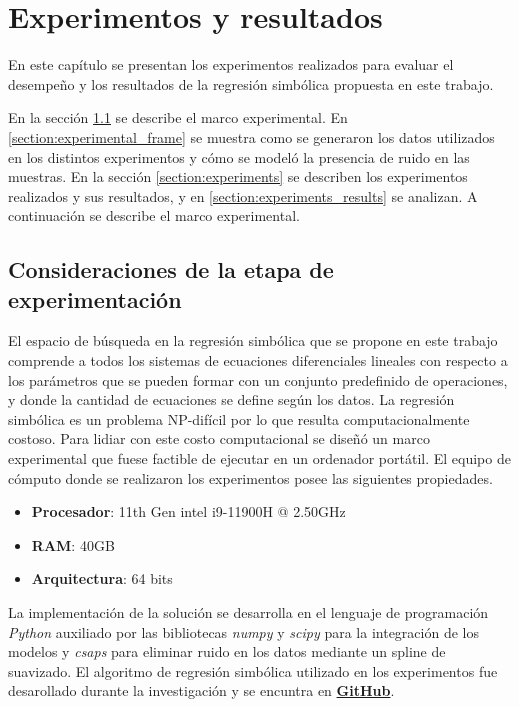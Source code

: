\chapter{Experimentos y resultados}\label{chapter:results}

En este capítulo se presentan los experimentos realizados para evaluar el desempeño y los resultados de la regresión simbólica propuesta en este trabajo.

En la sección \ref{section:experimental_considerations} se describe el marco experimental. En \ref{section:experimental_frame} se muestra como se generaron los datos utilizados en los distintos experimentos y cómo se modeló la presencia de ruido en las muestras. En la sección \ref{section:experiments} se describen los experimentos realizados y sus resultados, y en \ref{section:experiments_results} se analizan. A continuación se describe el marco experimental.

\section{Consideraciones de la etapa de experimentación}\label{section:experimental_considerations}

El espacio de búsqueda en la regresión simbólica que se propone en este trabajo comprende a todos los sistemas de ecuaciones diferenciales lineales con respecto a los parámetros que se pueden formar con un conjunto predefinido de operaciones, y donde la cantidad de ecuaciones se define según los datos. La regresión simbólica es un problema NP-difícil por lo que resulta computacionalmente costoso. Para lidiar con este costo computacional se diseñó un marco experimental que fuese factible de ejecutar en un ordenador portátil. El equipo de cómputo donde se realizaron los experimentos posee las siguientes propiedades.

\begin{itemize}
    \item \textbf{Procesador}: 11th Gen intel i9-11900H @ 2.50GHz
    \item \textbf{RAM}: 40GB
    \item \textbf{Arquitectura}: 64 bits
\end{itemize}

La implementación de la solución se desarrolla en el lenguaje de programación \emph{Python} auxiliado por las bibliotecas \emph{numpy} \cite{harris2020array} y \emph{scipy} \cite{2020SciPy-NMeth} para la integración de los modelos y \emph{csaps} \cite{csaps} para eliminar ruido en los datos mediante un spline de suavizado. El algoritmo de regresión simbólica utilizado en los experimentos fue desarollado durante la investigación y se encuntra en \href{https://github.com/kikeXD/symbolic_regression}{\textbf{GitHub}}.

